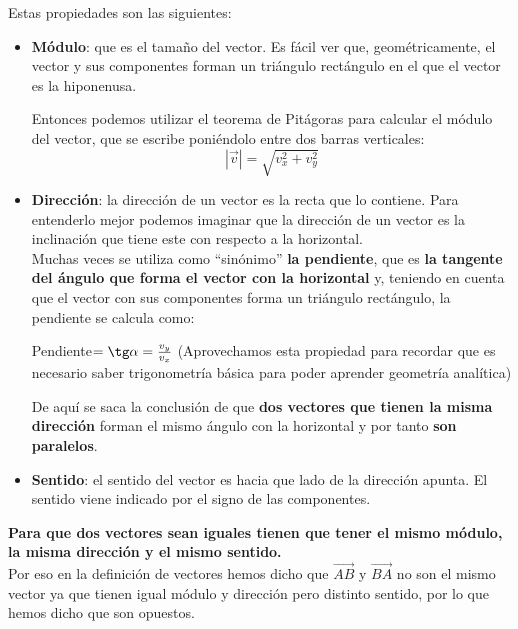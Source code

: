 \documentclass[a4paper,11pt,answers]{exam}
\begin{document}
Estas propiedades son las siguientes:
\begin{itemize}
\item \textbf{Módulo}: que es el tamaño del vector. Es fácil ver que, geométricamente, el vector y sus componentes forman un triángulo rectángulo en el que el vector es la hiponenusa.
  \begin{center}
  \end{center}
  Entonces podemos utilizar el teorema de Pitágoras para calcular el módulo del vector, que
  se escribe poniéndolo entre dos barras verticales:
  \[|\vec{v}| = \sqrt{v_x^2 + v_y^2}\] 
\item \textbf{Dirección}: la dirección de un vector es la recta que lo contiene. Para entenderlo
  mejor podemos imaginar que la dirección de un vector es la inclinación que tiene este con
  respecto a la horizontal.\\
  Muchas veces se utiliza como ``sinónimo'' \textbf{la pendiente}, que es \textbf{la tangente del
    ángulo que forma el vector con la horizontal} y, teniendo en cuenta que el vector con sus
  componentes forma un triángulo rectángulo, la pendiente se calcula como:
  \begin{center}
    Pendiente$=\tg \alpha = \frac{v_y}{v_x}$
    \small{(Aprovechamos esta propiedad para recordar que es necesario saber
      trigonometría básica para poder aprender geometría analítica)}
  \end{center}
  De aquí se saca la conclusión de que \textbf{dos vectores que tienen la misma dirección} forman el
  mismo ángulo con la horizontal y por tanto \textbf{son paralelos}.
\item \textbf{Sentido}: el sentido del vector es hacia que lado de la dirección apunta. El sentido
  viene indicado por el signo de las componentes.
\end{itemize}

\textbf{Para que dos vectores sean iguales tienen que tener el mismo módulo, la misma dirección
  y el mismo sentido.}\\
Por eso en la definición de vectores hemos dicho que $\overrightarrow{AB}$ y $\overrightarrow{BA}$
no son el mismo vector ya que tienen igual módulo y dirección pero distinto sentido, por lo que
hemos dicho que son opuestos.
\end{document}
